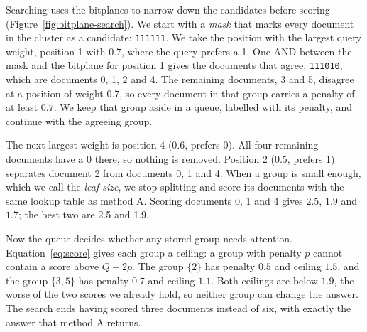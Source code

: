 Searching uses the bitplanes to narrow down the candidates before scoring
(Figure~\ref{fig:bitplane-search}). We start with a \emph{mask} that marks every document
in the cluster as a candidate: \texttt{111111}. We take the position with the largest query
weight, position 1 with $0.7$, where the query prefers a 1. One AND between the mask and the
bitplane for position 1 gives the documents that agree, \texttt{111010}, which are documents
0, 1, 2 and 4. The remaining documents, 3 and 5, disagree at a position of weight $0.7$, so
every document in that group carries a penalty of at least $0.7$. We keep that group aside
in a queue, labelled with its penalty, and continue with the agreeing group.

The next largest weight is position 4 ($0.6$, prefers 0). All four remaining documents have
a 0 there, so nothing is removed. Position 2 ($0.5$, prefers 1) separates document 2 from
documents 0, 1 and 4. When a group is small enough, which we call the \emph{leaf size}, we
stop splitting and score its documents with the same lookup table as method A. Scoring
documents 0, 1 and 4 gives $2.5$, $1.9$ and $1.7$; the best two are 2.5 and 1.9.

Now the queue decides whether any stored group needs attention. Equation~\ref{eq:score} gives
each group a ceiling: a group with penalty $p$ cannot contain a score above $Q-2p$. The group
$\{2\}$ has penalty $0.5$ and ceiling $1.5$, and the group $\{3,5\}$ has penalty $0.7$ and
ceiling $1.1$. Both ceilings are below $1.9$, the worse of the two scores we already hold, so
neither group can change the answer. The search ends having scored three documents instead
of six, with exactly the answer that method A returns.

